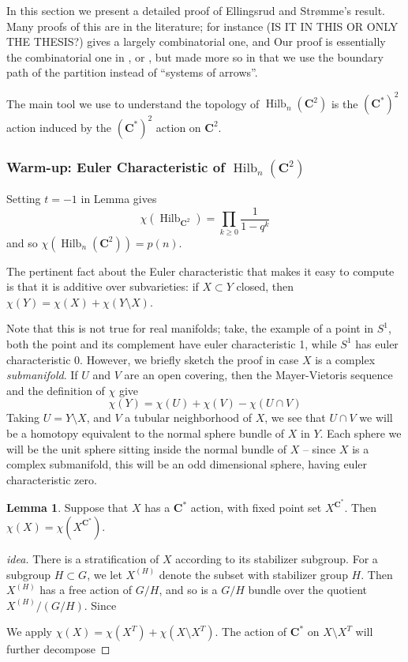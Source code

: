 \documentclass{amsart}[12pt]
\theoremstyle{definition}
\newtheorem{lemma}[dummy]{Lemma}
\newcommand{\C}{\mathbf{C}}
\DeclareMathOperator{\Hilb}{Hilb}
\begin{document}
In this section we present a detailed proof of Ellingsrud and Str\o mme's result.  Many proofs of this are in the literature; for instance \cite{cheah} (IS IT IN THIS OR ONLY THE THESIS?) gives a largely combinatorial one, and \cite{nakajimabook}   Our proof is essentially the combinatorial one in \cite{cheah}, or , but made more so in that we use the boundary path of the partition instead of ``systems of arrows''.  

The main tool we use to understand the topology of $\Hilb_n(\C^2)$ is the $(\C^*)^2$ action induced by the $(\C^*)^2$ action on $\C^2$.  




\subsubsection{Warm-up: Euler Characteristic of $\Hilb_n(\C^2)$}

Setting $t=-1$ in Lemma  gives
$$\chi(\Hilb_{\C^2})=\prod_{k\geq 0} \frac{1}{1-q^k}$$
and so $\chi(\Hilb_n(\C^2))=p(n)$.

The pertinent fact about the Euler characteristic that makes it easy to compute is that it is additive over subvarieties: if $X\subset Y$ closed, then $\chi(Y)=\chi(X)+\chi(Y\setminus X)$.

Note that this is not true for real manifolds; take, the example of a point in $S^1$, both the point and its complement have euler characteristic 1, while $S^1$ has euler characteristic 0.  However, we briefly sketch the proof in case $X$ is a complex \emph{submanifold}.  If $U$ and $V$ are an open covering, then the Mayer-Vietoris sequence and the definition of $\chi$ give
$$\chi(Y)=\chi(U)+\chi(V)-\chi(U\cap V)$$
Taking $U=Y\setminus X$, and $V$ a tubular neighborhood of $X$, we see that $U\cap V$ we will be a homotopy equivalent to the normal sphere bundle of $X$ in $Y$.  Each sphere we will be the unit sphere sitting inside the normal bundle of $X$ -- since $X$ is a complex submanifold, this will be an odd dimensional sphere, having euler characteristic zero.  

\begin{lemma}
Suppose that $X$ has a $\C^*$ action, with fixed point set $X^{\C^*}$.  Then $\chi(X)=\chi(X^{\C^*})$.
\end{lemma}

\begin{proof}[idea]
There is a stratification of $X$ according to its stabilizer subgroup.  For a subgroup $H\subset G$, we let $X^{(H)}$ denote the subset with stabilizer group $H$.  Then $X^{(H)}$ has a free action of $G/H$, and so is a $G/H$ bundle over the quotient $X^{(H)}/(G/H)$.  Since 

We apply $\chi(X)=\chi(X^T)+\chi(X\setminus X^T)$.  The action of $\C^*$ on $X\setminus X^T$ will further decompose
\end{proof}
\end{document}
